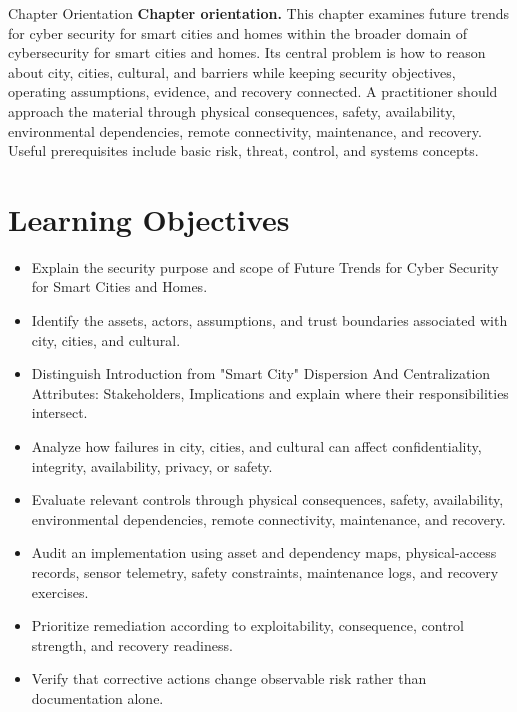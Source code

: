 \documentclass[11pt,letterpaper]{article}
\title{\CornellDocumentTitle}
\author{}
\date{}
\begin{document}
\maketitle
\begin{CornellOverviewBox}{Chapter Orientation}
\textbf{Chapter orientation.} This chapter examines future trends for cyber security for smart cities and homes within the broader domain of cybersecurity for smart cities and homes. Its central problem is how to reason about city, cities, cultural, and barriers while keeping security objectives, operating assumptions, evidence, and recovery connected. A practitioner should approach the material through physical consequences, safety, availability, environmental dependencies, remote connectivity, maintenance, and recovery. Useful prerequisites include basic risk, threat, control, and systems concepts.
\end{CornellOverviewBox}
\section*{Learning Objectives}
\begin{itemize}
\item Explain the security purpose and scope of Future Trends for Cyber Security for Smart Cities and Homes.
\item Identify the assets, actors, assumptions, and trust boundaries associated with city, cities, and cultural.
\item Distinguish Introduction from "Smart City" Dispersion And Centralization Attributes: Stakeholders, Implications and explain where their responsibilities intersect.
\item Analyze how failures in city, cities, and cultural can affect confidentiality, integrity, availability, privacy, or safety.
\item Evaluate relevant controls through physical consequences, safety, availability, environmental dependencies, remote connectivity, maintenance, and recovery.
\item Audit an implementation using asset and dependency maps, physical-access records, sensor telemetry, safety constraints, maintenance logs, and recovery exercises.
\item Prioritize remediation according to exploitability, consequence, control strength, and recovery readiness.
\item Verify that corrective actions change observable risk rather than documentation alone.
\end{itemize}
\end{document}
